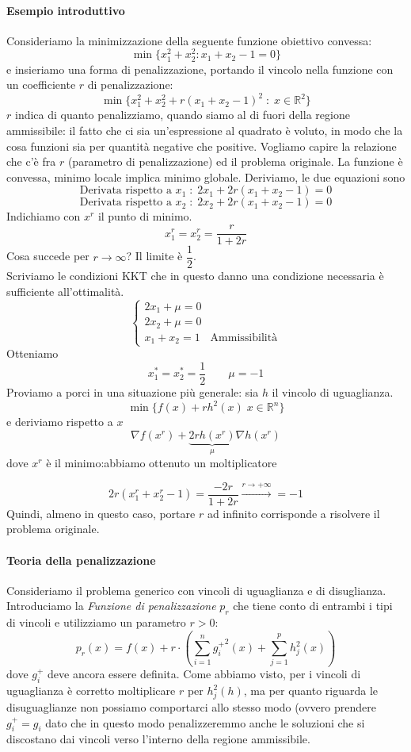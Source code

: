 \paragraph{Esempio introduttivo}
Consideriamo la minimizzazione della seguente funzione obiettivo convessa:
$$
\min \{ x_1^{2} + x_2^{2} : x_1 + x_2 -1 =0 \}
$$
e insieriamo una forma di penalizzazione, portando il vincolo
nella funzione con un coefficiente $r$ di penalizzazione:
$$
\min \{ x_1^{2} + x_2^{2} + r(x_1 + x_2 -1)^{2} \; : \;
x \in \mathbb{R}^{2}
\}
$$
$r$ indica di quanto penalizziamo, quando siamo al di fuori
della regione ammissibile: il fatto che ci sia un'espressione
al quadrato \`e voluto, in modo che la cosa funzioni sia
per quantit\`a negative che positive.
Vogliamo capire la relazione che c'\`e fra $r$ (parametro
di penalizzazione) ed il problema originale.
La funzione \`e convessa, minimo locale implica minimo
globale.
Deriviamo, le due equazioni sono
$$\text{Derivata rispetto a } x_1 \; :\;  2x_1 + 2r(x_1 + x_2 -1) = 0 $$
$$ \text{Derivata rispetto a }x_2\; : \; 2x_2 + 2r(x_1 + x_2 -1) = 0$$
Indichiamo con $x^{r}$ il punto di minimo.
$$ x_1^{r} = x_2^{r} = \dfrac{r}{1+2r}$$
Cosa succede per $r \to \infty$?
Il limite \`e $\dfrac{1}{2}$. \\
Scriviamo le condizioni KKT che in questo danno una condizione
necessaria \`e sufficiente all'ottimalit\`a.
$$
\left\{
\begin{array}{ll}
 2 x_1 + \mu = 0  & \\
 2 x_2 + \mu = 0  & \\
 x_1 + x_2 = 1 & \text{Ammissibilit\`a}
\end{array}
\right.
$$
Otteniamo
$$ x_1^{*} = x_2^{*} = \dfrac{1}{2}
\qquad \mu = -1
$$
Proviamo a porci in una situazione pi\`u generale: sia $h$ il
vincolo di uguaglianza.
$$
\min \{f(x) + rh^2(x)\; x \in \mathbb{R}^{n} \}
$$
e deriviamo rispetto a $x$
$$\nabla f(x^{r}) + \underbrace{2rh(x^{r})}_{\mu} \nabla h(x^{r})
$$
dove $x^r$ \`e il minimo:abbiamo ottenuto un moltiplicatore

$$ 2r(x_1^{r} + x_2^{r} -1 ) = \dfrac{-2r}{1+2r}
\xrightarrow{r \to + \infty} = -1
$$
Quindi, almeno in questo caso, portare $r$ ad infinito corrisponde
a risolvere il problema originale.
\paragraph{Teoria della penalizzazione}
Consideriamo il problema generico con vincoli di uguaglianza e di disuglianza. Introduciamo la \emph{Funzione di penalizzazione} $p_r$ che tiene conto di entrambi i tipi di vincoli e utilizziamo un parametro $r > 0$:
$$ p_r(x) = f(x) + r \cdot \left(
\displaystyle \sum_{i=1}^{n} {g^+_i}^{2}(x) +
\displaystyle \sum_{j=1}^{p} h_j^{2}(x)
\right)
$$
dove $g^+_i$ deve ancora essere definita. Come abbiamo visto, per i vincoli di uguaglianza è corretto moltiplicare $r$ per $h_j^2(h)$, ma per quanto riguarda le disuguaglianze non possiamo comportarci allo stesso modo (ovvero prendere $g^+_i = g_i$ dato che in questo modo penalizzeremmo anche le soluzioni che si discostano dai vincoli verso l'interno della regione ammissibile.

